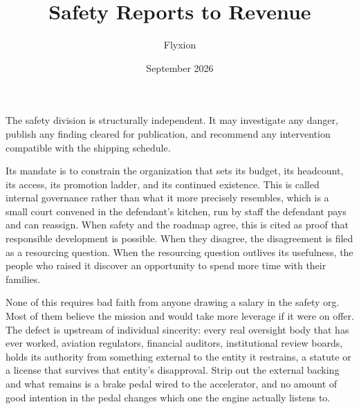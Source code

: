 \documentclass[11pt]{article}
\title{Safety Reports to Revenue}
\author{Flyxion}
\date{September 2026}
\begin{document}
\maketitle

The safety division is structurally independent. It may investigate any danger, publish any finding cleared for publication, and recommend any intervention compatible with the shipping schedule.

Its mandate is to constrain the organization that sets its budget, its headcount, its access, its promotion ladder, and its continued existence. This is called internal governance rather than what it more precisely resembles, which is a small court convened in the defendant's kitchen, run by staff the defendant pays and can reassign. When safety and the roadmap agree, this is cited as proof that responsible development is possible. When they disagree, the disagreement is filed as a resourcing question. When the resourcing question outlives its usefulness, the people who raised it discover an opportunity to spend more time with their families.

None of this requires bad faith from anyone drawing a salary in the safety org. Most of them believe the mission and would take more leverage if it were on offer. The defect is upstream of individual sincerity: every real oversight body that has ever worked, aviation regulators, financial auditors, institutional review boards, holds its authority from something external to the entity it restrains, a statute or a license that survives that entity's disapproval. Strip out the external backing and what remains is a brake pedal wired to the accelerator, and no amount of good intention in the pedal changes which one the engine actually listens to.
\end{document}
